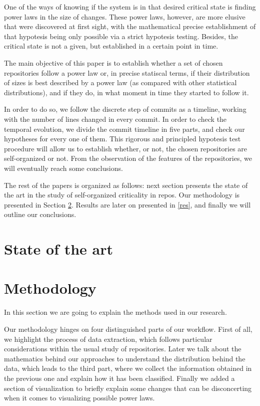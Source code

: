 \documentclass[conference]{IEEEtran}
\begin{document}
One of the ways of knowing if the system is in that desired critical
state is finding power laws in the size of changes. These power laws,
however, are more elusive that were discovered at first sight, with
the mathematical precise establishment of that hypotesis being only
possible via a strict hypotesis testing. Besides, the critical state
is not a given, but established in a certain point in time.

The main objective of this paper is to establish whether a set of
chosen repositories follow a power law or, in precise statiscal terms,
if their distribution of sizes is best described by a power law (as
compared with other statistical distributions), and if they do, in what moment
in time they started to follow it.

In order to do so, we follow the discrete step of commits as a
timeline, working with the number of lines changed in every commit. In
order to check the temporal evolution, we divide the commit timeline
in five parts, and check our hypotheses for every one of them. This
rigorous and principled hypotesis test procedure will allow us to
establish whether, or not, the chosen repositories are self-organized
or not. From the observation of the features of the repositories, we
will eventually reach some conclusions.


The rest of the papers is organized as follows: next section presents
the state of the art in the study of self-organized criticality in
repos. Our methodology is presented in Section
\ref{sec:method}. Results are later on presented in \ref{res}, and
finally we will outline our conclusions.

\section{State of the art}\label{soa}





\section{Methodology}
\label{sec:method}

In this section we are going to explain the methods used in our
research.

Our methodology hinges on four distinguished parts of our workflow.
First of all, we highlight the process of data extraction, which
follows particular considerations within the usual study of
repositories. Later we talk about the mathematics behind our
approaches to understand the distribution behind the data, which leads
to the third part, where we collect the information obtained in the
previous one and explain how it has been classified. Finally we added
a section of visualization to briefly explain some changes that can be
disconcerting when it comes to visualizing possible power laws.
\end{document}
